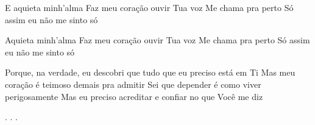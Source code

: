 E aquieta minh'alma
Faz meu coração ouvir Tua voz
Me chama pra perto
Só assim eu não me sinto só

Aquieta minh'alma
Faz meu coração ouvir Tua voz
Me chama pra perto
Só assim eu não me sinto só

Porque, na verdade, eu descobri que tudo que eu preciso está em Ti
Mas meu coração é teimoso demais pra admitir
Sei que depender é como viver perigosamente
Mas eu preciso acreditar e confiar no que Você me diz


\beginverse*
.
.
.
\endverse
\begin{comment}
\lstset{basicstyle=\scriptsize\bf} %
\tab{Solo 1}
\begin{lstlisting}
E|-----------------------------------------------------|
B|-----------------------------------------------------|
G|-----------------------------------------------------|
D|-----------------------------------------------------|
A|-----------------------------------------------------|
E|-----------------------------------------------------|
\end{lstlisting}
\end{comment}
\vspace{2em} 
% 
% 
% 
% 
\endsong
\begin{comment}

\end{comment}